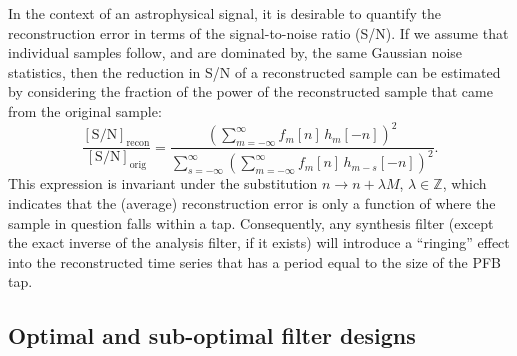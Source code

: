 \documentclass{pasa}%
\begin{document}
In the context of an astrophysical signal, it is desirable to quantify the reconstruction error in terms of the signal-to-noise ratio (S/N).
If we assume that individual samples follow, and are dominated by, the same Gaussian noise statistics, then the reduction in S/N of a reconstructed sample can be estimated by considering the fraction of the power of the reconstructed sample that came from the original sample:
\begin{equation}
    \frac{[\text{S/N}]_\text{recon}}{[\text{S/N}]_\text{orig}}
      = \frac{\left(\sum\limits_{m = -\infty}^{\infty} f_m[n]\,h_m[-n]\right)^2}{
            \sum\limits_{s = -\infty}^{\infty}
            \left(\sum\limits_{m = -\infty}^{\infty} f_m[n]\,h_{m-s}[-n]\right)^2
        }.
    \label{eqn:snr_long}
\end{equation}
This expression is invariant under the substitution $n \rightarrow n + \lambda M$, $\lambda \in \mathbb{Z}$, which indicates that the (average) reconstruction error is only a function of where the sample in question falls within a tap.
Consequently, any synthesis filter (except the exact inverse of the analysis filter, if it exists) will introduce a ``ringing'' effect into the reconstructed time series that has a period equal to the size of the PFB tap.

\subsection{Optimal and sub-optimal filter designs}
\end{document}
